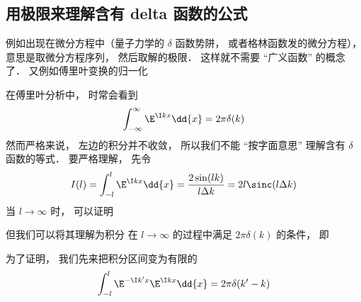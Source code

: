 \subsection{用极限来理解含有 delta 函数的公式}
例如出现在微分方程中（量子力学的 $\delta$ 函数势阱， 或者格林函数发的微分方程）， 意思是取微分方程序列， 然后取解的极限． 这样就不需要 “广义函数” 的概念了． 又例如傅里叶变换的归一化
\begin{example}{}
在傅里叶分析中， 时常会看到
\begin{equation}
\int_{-\infty}^\infty \E^{\I kx}\dd{x} = 2\pi \delta(k)
\end{equation}
然而严格来说， 左边的积分并不收敛， 所以我们不能 “按字面意思” 理解含有 $\delta$ 函数的等式． 要严格理解， 先令
\begin{equation}
I(l) = \int_{-l}^{l} \E^{\I kx}\dd{x} = \frac{2\sin(l k)}{l \Delta k} = 2l \sinc(l \Delta k)
\end{equation}
当 $l \to \infty$ 时， 可以证明


 但我们可以将其理解为积分 在 $l \to \infty$ 的过程中满足 $2\pi\delta(k)$ 的条件， 即 


为了证明， 我们先来把积分区间变为有限的
\begin{equation}
\int_{-l}^{l} \E^{-\I k' x}\E^{\I kx}\dd{x} = 2\pi \delta(k' - k)
\end{equation}
\end{example}
